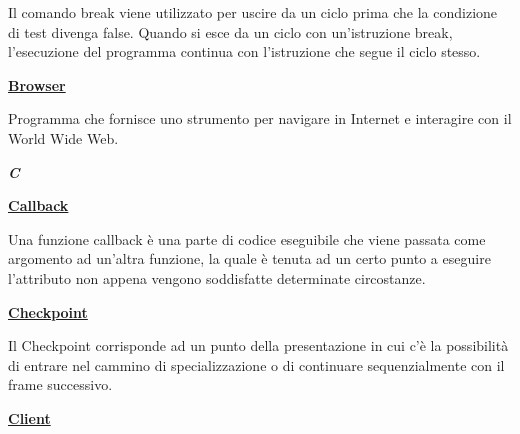 \medskip
\begin{addmargin}[5em]{1em}	
Il comando break viene utilizzato per uscire da un ciclo prima che la condizione di test divenga false. Quando si esce da un ciclo con un'istruzione break, l'esecuzione del programma continua con l'istruzione che segue il ciclo stesso.
\end{addmargin}

\bigskip
\begin{addmargin}[0em]{0em}	
	\textbf{\underline{Browser}}
\end{addmargin}
	
\medskip
\begin{addmargin}[5em]{1em}	
Programma che fornisce uno strumento per navigare in Internet e interagire con il World Wide Web.
\end{addmargin}

\newpage

\cleardoublepage
{}
{}
\noindent\hrulefill\hspace{4mm}\textbf{\textsl{\Huge{C}}}\hspace{4mm}\hrulefill

\vspace*{2\bigskipamount}

\begin{addmargin}[0em]{0em}
	\textbf{\underline{Callback}}
\end{addmargin}

\medskip
\begin{addmargin}[5em]{1em}
	Una funzione callback è una parte di codice eseguibile che viene passata come argomento ad un'altra funzione, la quale è tenuta ad un certo punto a eseguire l'attributo non appena vengono soddisfatte determinate circostanze.
\end{addmargin}		

\bigskip
\begin{addmargin}[0em]{0em}
	\textbf{\underline{Checkpoint}}
\end{addmargin}

\medskip
\begin{addmargin}[5em]{1em}
	Il Checkpoint corrisponde ad un punto della presentazione in cui c'è la possibilità di entrare nel cammino di specializzazione o di continuare sequenzialmente con il frame successivo.  	
\end{addmargin}	

\bigskip
\begin{addmargin}[0em]{0em}
	\textbf{\underline{Client}}
\end{addmargin}

